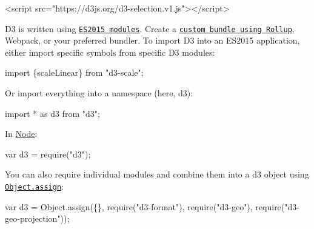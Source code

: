 \begin{DoxyCode}
<script src="https://d3js.org/d3-selection.v1.js"></script>
\end{DoxyCode}


D3 is written using \href{http://www.2ality.com/2014/09/es6-modules-final.html}{\tt E\+S2015 modules}. Create a \href{https://bl.ocks.org/mbostock/bb09af4c39c79cffcde4}{\tt custom bundle using Rollup}, Webpack, or your preferred bundler. To import D3 into an E\+S2015 application, either import specific symbols from specific D3 modules\+:


\begin{DoxyCode}
import \{scaleLinear\} from "d3-scale";
\end{DoxyCode}


Or import everything into a namespace (here, {\ttfamily d3})\+:


\begin{DoxyCode}
import * as d3 from "d3";
\end{DoxyCode}


In \mbox{\hyperlink{classNode}{Node}}\+:


\begin{DoxyCode}
var d3 = require("d3");
\end{DoxyCode}


You can also require individual modules and combine them into a {\ttfamily d3} object using \href{https://developer.mozilla.org/en-US/docs/Web/JavaScript/Reference/Global_Objects/Object/assign}{\tt Object.\+assign}\+:


\begin{DoxyCode}
var d3 = Object.assign(\{\}, require("d3-format"), require("d3-geo"), require("d3-geo-projection"));
\end{DoxyCode}
 